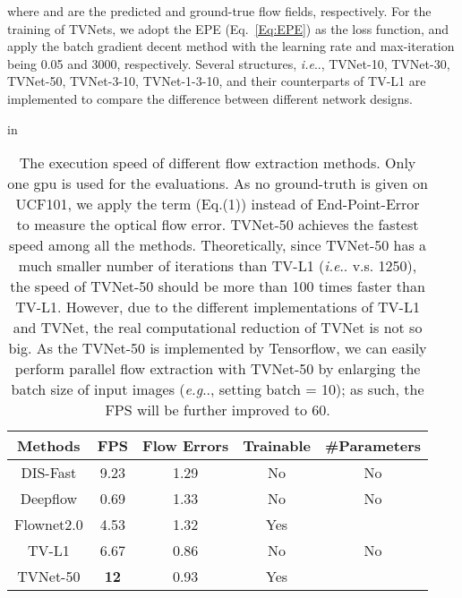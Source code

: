 \documentclass[10pt,twocolumn,letterpaper]{article}
\makeatletter
\DeclareRobustCommand\onedot{\futurelet\@let@token\@onedot}
\def\@onedot{\ifx\@let@token.\else.\null\fi\xspace}
\def\eg{\emph{e.g}\onedot} \def\Eg{\emph{E.g}\onedot}
\def\ie{\emph{i.e}\onedot} \def\Ie{\emph{I.e}\onedot}
\makeatother
\begin{document}
where  and  are the predicted and ground-true flow fields, respectively.
For the training of TVNets, we adopt the EPE (Eq.~\eqref{Eq:EPE}) as the loss function, and apply the batch gradient decent method with the learning rate and max-iteration being 0.05 and 3000, respectively.
Several structures, \ie, TVNet-10, TVNet-30, TVNet-50, TVNet-3-10, TVNet-1-3-10, and their counterparts of TV-L1 are implemented to compare the difference between different network designs.

\begin{table}[t!]
 in
\centering
\caption{The execution speed of different flow extraction methods. Only one gpu is used for the evaluations. As no ground-truth is given on UCF101, we apply the term  (Eq.(1)) instead of End-Point-Error to measure the optical flow error. TVNet-50 achieves the fastest speed among all the methods. Theoretically, since TVNet-50 has a much smaller number of iterations than TV-L1 (\ie 50 v.s. 1250), the speed of TVNet-50 should be more than 100 times faster than TV-L1. However, due to the different implementations of TV-L1 and TVNet, the real computational reduction of TVNet is not so big.
As the TVNet-50 is implemented by Tensorflow, we can easily perform parallel flow extraction with TVNet-50 by enlarging the batch size of input images (\eg, setting batch = 10); as such, the FPS will be further improved to 60.}
\label{Tab:time}
\tabcolsep 4pt \renewcommand{\arraystretch}{0.8}
\begin{tabular}{c|c|c|c|c}
\toprule
Methods         & FPS  & Flow Errors & Trainable & \#Parameters\\
\hline
DIS-Fast        & 9.23  & 1.29 & No & No     \\
Deepflow        & 0.69  & 1.33 & No & No     \\
Flownet2.0      & 4.53  & 1.32 & Yes &      \\
TV-L1           & 6.67  & 0.86 & No & No     \\
\hline
TVNet-50       & \textbf{12} & 0.93 & Yes & \\
\bottomrule
\end{tabular}
\vskip -0.05in
\end{table}
\end{document}
